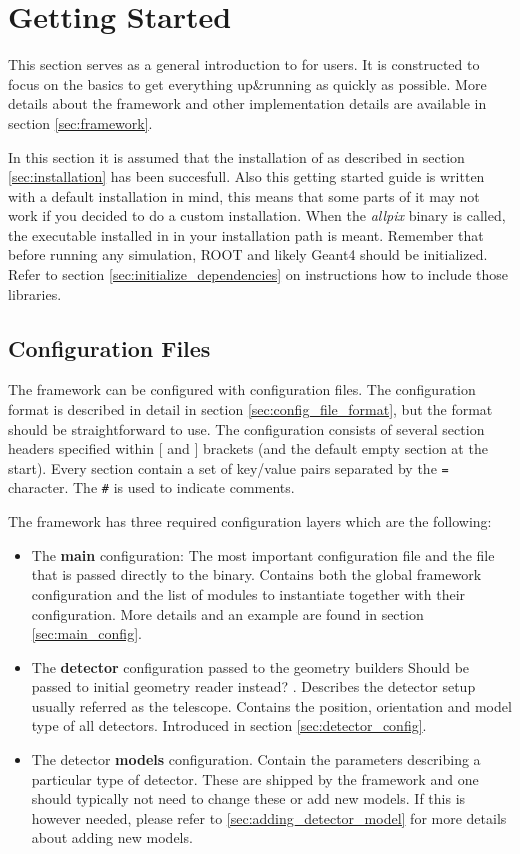 \section{Getting Started}
This section serves as a general introduction to \apsq for users. It is constructed to focus on the basics to get everything up\&running as quickly as possible. More details about the framework and other implementation details are available in section \ref{sec:framework}.

In this section it is assumed that the installation of \apsq as described in section \ref{sec:installation} has been succesfull. Also this getting started guide is written with a default installation in mind, this means that some parts of it may not work if you decided to do a custom installation. When the \textit{allpix} binary is called, the executable installed in  in your installation path is meant. Remember that before running any \apsq simulation, ROOT and likely Geant4 should be initialized. Refer to section \ref{sec:initialize_dependencies} on instructions how to include those libraries.

\subsection{Configuration Files}
\label{sec:configuration_files}
The framework can be configured with configuration files. The configuration format is described in detail in section \ref{sec:config_file_format}, but the format should be straightforward to use. The configuration consists of several section headers specified within $[$ and $]$ brackets (and the default empty section at the start). Every section contain a set of key/value pairs separated by the \texttt{=} character. The \texttt{\#} is used to indicate comments.

The framework has three required configuration layers which are the following:
\begin{itemize}
\item The \textbf{main} configuration: The most important configuration file and the file that is passed directly to the binary. Contains both the global framework configuration and the list of modules to instantiate together with their configuration. More details and an example are found in section \ref{sec:main_config}.
\item The \textbf{detector} configuration passed to the geometry builders \todo Should be passed to initial geometry reader instead? \todo. Describes the detector setup usually referred as the telescope. Contains the position, orientation and model type of all detectors. Introduced in section \ref{sec:detector_config}.
\item The detector \textbf{models} configuration. Contain the parameters describing a particular type of detector. These are shipped by the framework and one should typically not need to change these or add new models. If this is however needed, please refer to \ref{sec:adding_detector_model} for more details about adding new models.
\end{itemize}

